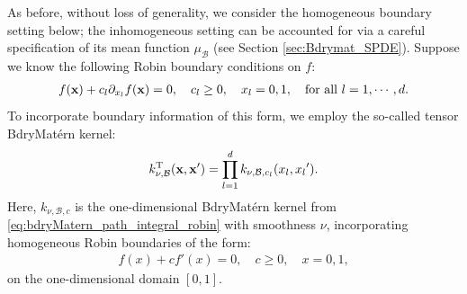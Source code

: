 \documentclass[aos,preprint]{imsart}
\theoremstyle{plain}
\newcommand{\BFx}{\bold x}
\theoremstyle{remark}
\begin{document}
As before, without loss of generality, we consider the homogeneous boundary setting below; the inhomogeneous setting can be accounted for via a careful specification of its mean function $\mu_{\mathcal{B}}$ (see Section \ref{sec:Bdrymat_SPDE}). Suppose we know the following Robin boundary conditions on $f$:
\begin{align}
\label{eq:boundar_mixed_full}
f(\BFx)+c_l\partial_{x_l}f(\BFx)=0,\quad c_l\geq 0, \quad x_l=0,1, \quad \text{for all } l=1,\cdots,d.
\end{align}
To incorporate boundary information of this form, we employ the so-called tensor BdryMat\'ern kernel:
\begin{equation}
k_{\nu,\mathcal{B}}^{\rm T}(\mathbf{x},\mathbf{x}') = \prod_{l=1}^d k_{\nu,\mathcal{B},c_l}({x_l},{x_l}').
\label{eq:tensorbdry}
\end{equation}
Here, $k_{\nu,\mathcal{B},c}$ is the one-dimensional BdryMat\'ern kernel from \eqref{eq:bdryMatern_path_integral_robin} with smoothness $\nu$, incorporating homogeneous Robin boundaries of the form:
\begin{align}
\label{eq:boundar_mixed_1D}
   f(x)+cf'(x)=0, \quad c\geq 0, \quad x=0,1,
\end{align}
on the one-dimensional domain $[0,1]$.



\end{document}
